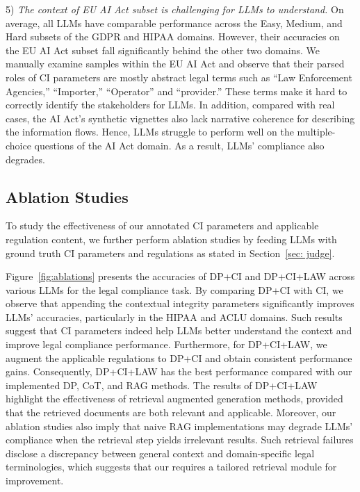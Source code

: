5) \textit{The context of EU AI Act subset is challenging for LLMs to understand.}
On average, all LLMs have comparable performance across the Easy, Medium, and Hard subsets of the GDPR and HIPAA domains.
However, their accuracies on the EU AI Act subset fall significantly behind the other two domains.
We manually examine samples within the EU AI Act and observe that their parsed roles of CI parameters are mostly abstract legal terms such as ``Law Enforcement Agencies,'' ``Importer,'' ``Operator'' and ``provider.'' 
These terms make it hard to correctly identify the stakeholders for LLMs.
In addition, compared with real cases, the AI Act's synthetic vignettes also lack narrative coherence for describing the information flows.
Hence, LLMs struggle to perform well on the multiple-choice questions of the AI Act domain.
As a result, LLMs' compliance also degrades.


%

\subsection{Ablation Studies}

To study the effectiveness of our annotated CI parameters and applicable regulation content, we further perform ablation studies by feeding LLMs with ground truth CI parameters and regulations as stated in Section~\ref{sec: judge}.

Figure~\ref{fig:ablations} presents the accuracies of DP+CI and DP+CI+LAW across various LLMs for the legal compliance task.
By comparing DP+CI with CI, we observe that appending the contextual integrity parameters significantly improves LLMs' accuracies, particularly in the HIPAA and ACLU domains. 
Such results suggest that CI parameters indeed help LLMs better understand the context and improve legal compliance performance.
Furthermore,  for DP+CI+LAW, we augment the applicable regulations to DP+CI and obtain consistent performance gains.
Consequently, DP+CI+LAW has the best performance compared with our implemented DP, CoT, and RAG methods.
The results of DP+CI+LAW highlight the effectiveness of retrieval augmented generation methods, provided that the retrieved documents are both relevant and applicable.
Moreover, our ablation studies also imply that naive RAG implementations may degrade LLMs' compliance when the retrieval step yields irrelevant results. 
Such retrieval failures disclose a discrepancy between general context and domain-specific legal terminologies, which suggests that our \name requires a tailored retrieval module for improvement.


